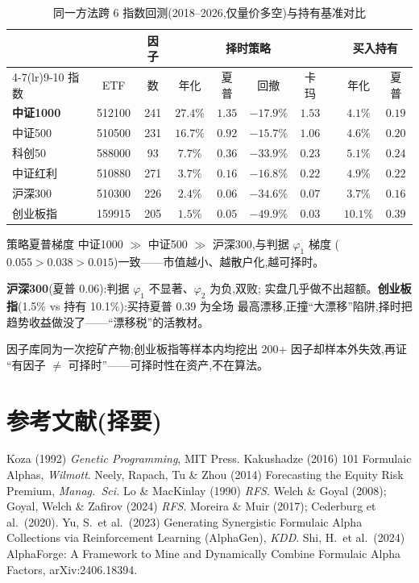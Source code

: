 \documentclass[11pt,a4paper,fontset=mac]{ctexart}
\begin{document}
\begin{table}[htbp]\centering
\caption{同一方法跨 6 指数回测(2018--2026,仅量价多空)与持有基准对比}\label{tab:cross_bt}
\small\begin{threeparttable}
\begin{tabular}{lc c cccc c cc}
\toprule
& & 因子 & \multicolumn{4}{c}{择时策略} & & \multicolumn{2}{c}{买入持有} \\
\cmidrule(lr){4-7}\cmidrule(lr){9-10}
指数 & ETF & 数 & 年化 & 夏普 & 回撤 & 卡玛 & & 年化 & 夏普 \\
\midrule
\textbf{中证1000} & 512100 & 241 & $\mathbf{27.4\%}$ & $\mathbf{1.35}$ & $-17.9\%$ & $\mathbf{1.53}$ & & $4.1\%$ & $0.19$ \\
中证500          & 510500 & 231 & $16.7\%$ & $0.92$ & $-15.7\%$ & $1.06$ & & $4.6\%$ & $0.20$ \\
科创50           & 588000 & 93  & $7.7\%$  & $0.36$ & $-33.9\%$ & $0.23$ & & $5.1\%$ & $0.24$ \\
中证红利          & 510880 & 271 & $3.7\%$  & $0.16$ & $-16.8\%$ & $0.22$ & & $4.9\%$ & $0.22$ \\
沪深300          & 510300 & 226 & $2.4\%$  & $0.06$ & $-34.6\%$ & $0.07$ & & $3.7\%$ & $0.16$ \\
创业板指          & 159915 & 205 & $1.5\%$  & $0.05$ & $-49.9\%$ & $0.03$ & & $10.1\%$& $0.39$ \\
\bottomrule
\end{tabular}
\begin{tablenotes}\scriptsize
\item 策略夏普梯度 中证1000 $\gg$ 中证500 $\gg$ 沪深300,与判据 $\varphi_1$ 梯度
($0.055>0.038>0.015$)一致——市值越小、越散户化,越可择时。
\item \textbf{沪深300}(夏普 0.06):判据 $\varphi_1$ 不显著、$\varphi_2$ 为负,双败;
实盘几乎做不出超额。\textbf{创业板指}(1.5\% vs 持有 10.1\%):买持夏普 0.39 为全场
最高漂移,正撞``大漂移''陷阱,择时把趋势收益做没了——``漂移税''的活教材。
\item 因子库同为一次挖矿产物;创业板指等样本内均挖出 200+ 因子却样本外失效,再证
``有因子 $\ne$ 可择时''——可择时性在资产,不在算法。
\end{tablenotes}\end{threeparttable}
\end{table}

\section*{参考文献(择要)}
\small
Koza (1992) \emph{Genetic Programming}, MIT Press. \quad
Kakushadze (2016) 101 Formulaic Alphas, \emph{Wilmott}. \quad
Neely, Rapach, Tu \& Zhou (2014) Forecasting the Equity Risk Premium, \emph{Manag.\ Sci.} \quad
Lo \& MacKinlay (1990) \emph{RFS}. \quad
Welch \& Goyal (2008); Goyal, Welch \& Zafirov (2024) \emph{RFS}. \quad
Moreira \& Muir (2017); Cederburg et al.\ (2020). \quad
Yu, S.\ et al.\ (2023) Generating Synergistic Formulaic Alpha Collections via
Reinforcement Learning (AlphaGen), \emph{KDD}. \quad
Shi, H.\ et al.\ (2024) AlphaForge: A Framework to Mine and Dynamically Combine
Formulaic Alpha Factors, arXiv:2406.18394.
\end{document}
